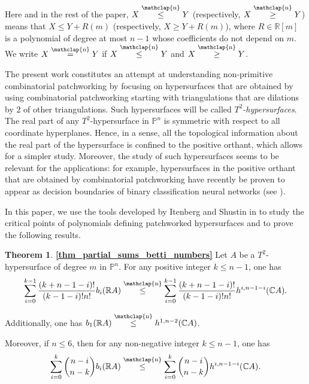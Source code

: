 \documentclass[12pt]{article}
\newcommand\customeq{\stackrel{\mathclap{\normalfont\scriptsize\mbox{n}}}{=}}
\newcommand\customleq{\stackrel{\mathclap{\normalfont\scriptsize\mbox{n}}}{\leq}}
\newcommand\customgeq{\stackrel{\mathclap{\normalfont\scriptsize\mbox{n}}}{\geq}}
\newcommand{\R}{\mathbb{R}}
\newcommand{\C}{\mathbb{C}}
\renewcommand{\P}{\mathbb{P}}
\theoremstyle{definition}
\newtheorem*{thm*}{Theorem}
\begin{document}
Here and in the rest of the paper, $X \customleq Y$ (respectively, $X \customgeq Y$) means that $X \leq Y + R(m)$ (respectively, $X \geq Y + R(m)$), where $R \in \R[m]$ is a polynomial of degree at most $n-1$ whose coefficients do not depend on $m$. We write $X \customeq Y$ if $X \customleq Y$ and $X \customgeq Y$.

The present work constitutes an attempt at understanding non-primitive combinatorial patchworking by focusing on hypersurfaces that are obtained by using combinatorial patchworking starting with triangulations that are dilations by $2$ of other triangulations. Such hypersurfaces will be called $T^2$\textit{-hypersurfaces}. The real part of any $T^2$-hypersurface in $\P^n$ is symmetric with respect to all coordinate hyperplanes. Hence, in a sense, all the topological information about the real part of the hypersurface is confined to the positive orthant, which allows for a simpler study. Moreover, the study of such hypersurfaces seems to be relevant for the applications: for example, hypersurfaces in the positive orthant that are obtained by combinatorial patchworking have recently be proven to appear as decision boundaries of binary classification neural networks (see \cite{machinelearningduportugal}).

In this paper, we use the tools developed by Itenberg and Shustin in \cite{itenbergshustincritpts} to study the critical points of polynomials defining patchworked hypersurfaces and to prove the following results.

\begin{thm*}
    \textbf{\ref{thm_partial_sums_betti_numbers}}
    Let $A$ be a $T^2$-hypersurface of degree $m$ in $\P^n$.
    For any positive integer $k \leq n-1$, one has
    \begin{equation*}
    \sum_{i=0}^{k-1} \frac{(k+n-1-i)!}{(k-1-i)!n!} b_i(\R A) \customleq \sum_{i=0}^{k-1} \frac{(k+n-1-i)!}{(k-1-i)!n!} h^{i,n-1-i}(\C A).\end{equation*}
    
    Additionally, one has $b_1(\R A) \customleq h^{1,n-2}(\C A)$.

    Moreover, if $n \leq 6$, then for any non-negative integer $k\leq n-1$, one has
    \begin{equation*}
        \sum_{i=0}^k { n-i \choose n-k } b_i(\R A) \customleq \sum_{i=0}^k { n-i \choose n-k } h^{i,n-1-i}(\C A).
    \end{equation*}
\end{thm*}
\end{document}
